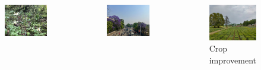 \documentclass[11pt,ignorenonframetext,aspectratio=169]{beamer}
\begin{document}
\begin{frame}{}
\protect\hypertarget{section}{}
\begin{columns}[T,onlytextwidth]
  

\begin{figure}
\includegraphics[width=0.7\linewidth]{../images/wild_flowers_abroad} \end{figure}
\begin{figure}
\includegraphics[width=0.7\linewidth]{../images/jacaranda_kathmandu} \end{figure}


\begin{figure}
\includegraphics[width=0.96\linewidth]{../images/wheat_trial_plots} \caption{Crop improvement}\label{fig:genetics-applications-2}
\end{figure}


\end{columns}
\end{frame}
\end{document}
